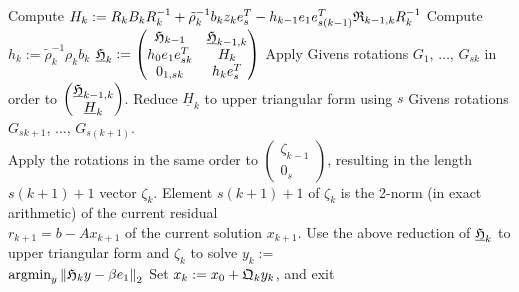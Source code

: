 \documentclass{scrartcl}
\newcommand{\norm}[1]{\left\lVert#1\right\rVert}
\begin{document}
\begin{algorithm}
\begin{algorithmic}[1]
			\STATE Compute $H_k := R_k B_k R^{-1}_k + \tilde{\rho}^{-1}_k b_k z_k e^T_s - h_{k-1} e_1 e^T_{s(k-1)} \frak{R}_{k-1,k} R^{-1}_k$
			\STATE Compute $h_k := \tilde{\rho}^{-1}_k \rho_k b_k$
			\STATE $\underline{\frak{H}}_k := 
			\begin{pmatrix}
				\frak{H}_{k - 1} & \underline{\frak{H}}_{k - 1,k} \\
				h_0 e_1 e^T_{sk} & H_k \\
				0_{1,sk} & h_k e^T_s \\
			\end{pmatrix}$
			\STATE Apply Givens rotations $G_1$, $\ldots$, $G_{sk}$ in order to $\begin{pmatrix}
	\underline{\frak{H}}_{k - 1,k} \\
	\underline{H}_k \\
\end{pmatrix}$.
			\STATE Reduce $\underline{H}_k$ to upper triangular form using $s$ Givens rotations $G_{sk + 1}$, $\ldots$, $G_{s(k + 1)}$. \\
\hspace{\algorithmicindent} Apply the rotations in the same order to $\begin{pmatrix}
	\zeta_{k - 1} \\
	0_s
\end{pmatrix}$, resulting in the length \\
\hspace{\algorithmicindent} \mbox{$s(k + 1) + 1$} vector $\zeta_k$.
		\ENDIF
	\STATE Element $s(k + 1) + 1$ of $\zeta_k$ is the 2-norm (in exact arithmetic) of the current residual \\
\hspace{\algorithmicindent} $r_{k + 1} = b - Ax_{k + 1}$ of the current solution $x_{k + 1}$.
		\STATE Use the above reduction of $\underline{\frak{H}}_k$ to upper triangular form and $\zeta_k$ to solve $y_k :=$ \\ \hspace{\algorithmicindent} $\text{argmin}_{y} \norm{\frak{H}_ky - \beta e_1}_2$
		\STATE Set $x_k := x_0 + \frak{Q}_k y_k$, and exit
	\ENDIF
	\ENDFOR 
\end{algorithmic}
\end{algorithm}
\end{document}
